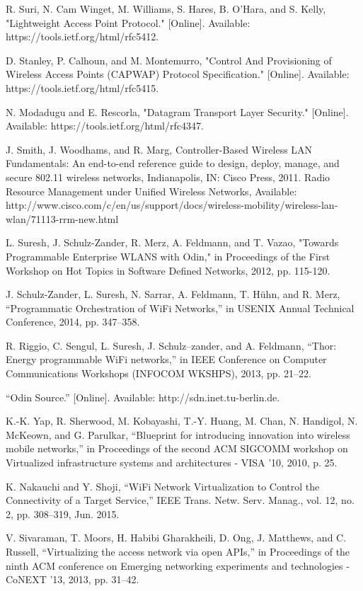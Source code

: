 \begin{thebibliography}{1}
 R. Suri, N. Cam Winget, M. Williams, S. Hares, B. O'Hara, and S. Kelly, "Lightweight Access Point Protocol." [Online]. Available: https://tools.ietf.org/html/rfc5412.

 D. Stanley, P. Calhoun, and M. Montemurro, "Control And Provisioning of Wireless Access Points (CAPWAP) Protocol Specification." [Online]. Available: https://tools.ietf.org/html/rfc5415.

 N. Modadugu and E. Rescorla, "Datagram Transport Layer Security." [Online]. Available: https://tools.ietf.org/html/rfc4347.

 J. Smith, J. Woodhams, and R. Marg, Controller-Based Wireless LAN Fundamentals: An end-to-end reference guide to design, deploy, manage, and secure 802.11 wireless networks, Indianapolis, IN: Cisco Press, 2011.
 Radio Resource Management under Unified Wireless Networks, Available: http://www.cisco.com/c/en/us/support/docs/wireless-mobility/wireless-lan-wlan/71113-rrm-new.html

 L. Suresh, J. Schulz-Zander, R. Merz, A. Feldmann, and T. Vazao, "Towards Programmable Enterprise WLANS with Odin," in Proceedings of the First Workshop on Hot Topics in Software Defined Networks, 2012, pp. 115-120.

 J. Schulz-Zander, L. Suresh, N. Sarrar, A. Feldmann, T. Hühn, and R. Merz, “Programmatic Orchestration of WiFi Networks,” in USENIX Annual Technical Conference, 2014, pp. 347–358.

 R. Riggio, C. Sengul, L. Suresh, J. Schulz–zander, and A. Feldmann, “Thor: Energy programmable WiFi networks,” in IEEE Conference on Computer Communications Workshops (INFOCOM WKSHPS), 2013, pp. 21–22.

 “Odin Source.” [Online]. Available: http://sdn.inet.tu-berlin.de.

 K.-K. Yap, R. Sherwood, M. Kobayashi, T.-Y. Huang, M. Chan, N. Handigol, N. McKeown, and G. Parulkar, “Blueprint for introducing innovation into wireless mobile networks,” in Proceedings of the second ACM SIGCOMM workshop on Virtualized infrastructure systems and architectures - VISA ’10, 2010, p. 25.

 K. Nakauchi and Y. Shoji, “WiFi Network Virtualization to Control the Connectivity of a Target Service,” IEEE Trans. Netw. Serv. Manag., vol. 12, no. 2, pp. 308–319, Jun. 2015.

 V. Sivaraman, T. Moors, H. Habibi Gharakheili, D. Ong, J. Matthews, and C. Russell, “Virtualizing the access network via open APIs,” in Proceedings of the ninth ACM conference on Emerging networking experiments and technologies - CoNEXT ’13, 2013, pp. 31–42.


\end{thebibliography}
